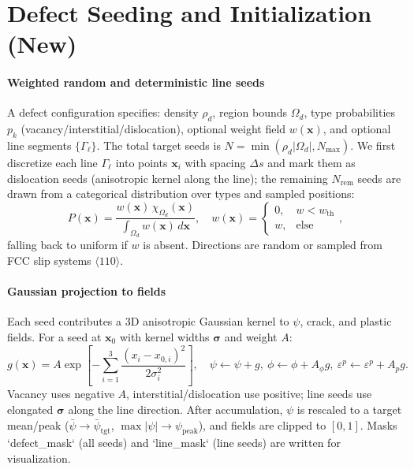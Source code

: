\documentclass[11pt]{article}
\begin{document}
\section{Defect Seeding and Initialization (New)}
\paragraph{Weighted random and deterministic line seeds} A defect configuration specifies: density $\rho_d$, region bounds $\Omega_d$, type probabilities $p_k$ (vacancy/interstitial/dislocation), optional weight field $w(\mathbf{x})$, and optional line segments $\{\Gamma_\ell\}$. The total target seeds is $N=\min(\rho_d |\Omega_d|, N_{\max})$. We first discretize each line $\Gamma_\ell$ into points $\mathbf{x}_i$ with spacing $\Delta s$ and mark them as dislocation seeds (anisotropic kernel along the line); the remaining $N_{\text{rem}}$ seeds are drawn from a categorical distribution over types and sampled positions:
\begin{equation}
P(\mathbf{x}) = \frac{w(\mathbf{x})\,\chi_{\Omega_d}(\mathbf{x})}{\int_{\Omega_d} w(\mathbf{x})\,d\mathbf{x}}, \quad w(\mathbf{x}) = \begin{cases}0,&w< w_{\text{th}}\\ w,&\text{else}\end{cases},
\end{equation}
falling back to uniform if $w$ is absent. Directions are random or sampled from FCC slip systems $\langle 110\rangle$.

\paragraph{Gaussian projection to fields} Each seed contributes a 3D anisotropic Gaussian kernel to $\psi$, crack, and plastic fields. For a seed at $\mathbf{x}_0$ with kernel widths $\boldsymbol{\sigma}$ and weight $A$:
\begin{equation}
g(\mathbf{x}) = A \exp\!\left[-\sum_{i=1}^3 \frac{(x_i-x_{0,i})^2}{2\sigma_i^2}\right], \quad
\psi \leftarrow \psi + g,\ \phi \leftarrow \phi + A_\phi g,\ \varepsilon^p \leftarrow \varepsilon^p + A_p g.
\end{equation}
Vacancy uses negative $A$, interstitial/dislocation use positive; line seeds use elongated $\boldsymbol{\sigma}$ along the line direction. After accumulation, $\psi$ is rescaled to a target mean/peak ($\bar{\psi}\rightarrow \bar{\psi}_{\text{tgt}}$, $\max|\psi|\rightarrow \psi_{\text{peak}}$), and fields are clipped to $[0,1]$. Masks `defect_mask` (all seeds) and `line_mask` (line seeds) are written for visualization.
\end{document}
